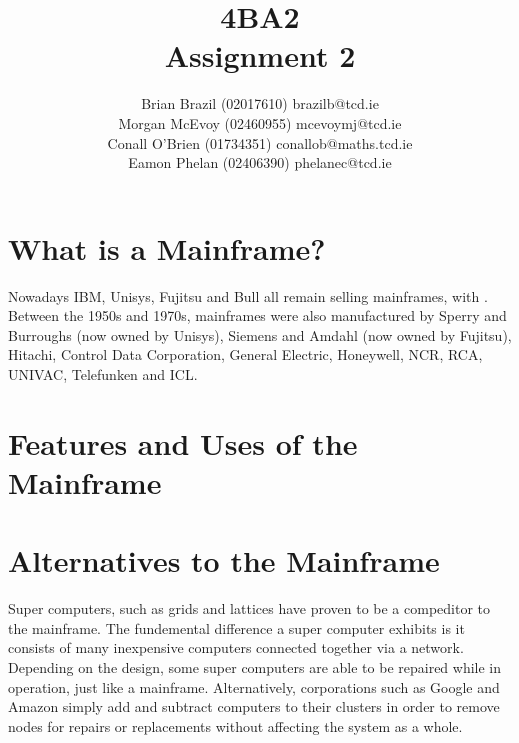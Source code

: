 \documentclass[a4paper,12pt]{article}
\begin{document}


\title{4BA2 \\ Assignment 2}

\author{Brian Brazil (02017610) brazilb@tcd.ie \\  Morgan McEvoy
(02460955) mcevoymj@tcd.ie \\ Conall O'Brien (01734351)
conallob@maths.tcd.ie \\ Eamon Phelan (02406390) phelanec@tcd.ie}

\maketitle

\section{What is a Mainframe?}

\cite[Mainframes (often colloquially referred to as big iron) are large and 
"expensive" computers used mainly by government institutions and 
large companies for mission critical applications, typically bulk data 
processing such as censuses, industry/consumer statistics, ERP, and 
financial transaction processing]{m1}


Nowadays IBM, Unisys, Fujitsu and Bull all remain selling mainframes,
with \cite[IBM mainframes dominating the market at over 90\%]{m1}.
Between the 1950s and 1970s, mainframes were also manufactured by 
Sperry and Burroughs (now owned by Unisys), Siemens and Amdahl (now 
owned by Fujitsu), Hitachi, Control Data Corporation, General Electric, 
Honeywell, NCR, RCA, UNIVAC, Telefunken and ICL. \cite [ IBM's 
dominance grew out of their development of the 360 series mainframes; 
this basic architecture has continued to evolve into their current 
zSeries/z9 mainframe, which is arguably the only mainframe architecture 
still extant that dates from this early period.]{m1}

\section{Features and Uses of the Mainframe}

\section{Alternatives to the Mainframe}

Super computers, such as grids and lattices have proven to be a
compeditor to the mainframe. The fundemental difference a super computer
exhibits is it consists of many inexpensive computers connected
together via a network. Depending on the design, some super computers 
are able to be repaired while in operation, just like a mainframe. 
Alternatively, corporations such as Google and Amazon simply add and 
subtract computers to their clusters in order to remove nodes for 
repairs or replacements without affecting the system as a whole.
\end{document}
